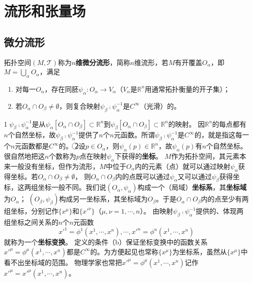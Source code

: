 \chapter{流形和张量场}

\section{微分流形}

\begin{definition}
拓扑空间$(M, \mathscr{T})$称为\textbf{$n$维微分流形}，简称$n$维流形，若$M$有开覆盖${O_\alpha}$，即$M = \bigcup\limits_\alpha O_\alpha$，满足
\begin{enumerate}[（a）]
\item 对每一$O_\alpha$，存在同胚$\psi_\alpha \colon O_\alpha \to V_\alpha$（$V_\alpha$是$\mathbb{R}^n$用通常拓扑衡量的开子集）；
\item 若$O_\alpha \cap O_\beta \neq \emptyset$，则复合映射$\psi_\beta \comp \psi_\alpha^{-1}$是$C^\infty$（光滑）的。
\end{enumerate}
\end{definition}

\begin{note}
\textcircled{1}$\psi_\beta \comp \psi_\alpha^{-1}$是从$\psi_\alpha[O_\alpha \cap O_\beta] \subset \mathbb{R}^n$到$\psi_\beta[O_\alpha \cap O_\beta] \subset \mathbb{R}^n$的映射。
因$\mathbb{R}^n$的每点都有$n$个自然坐标，故$\psi_\beta \comp \psi_\alpha^{-1}$提供了$n$个$n$元函数。所谓$\psi_\beta \comp \psi_\alpha^{-1}$是$C^\infty$的，就是指这每一个$n$元函数都是$C^\infty$的。
\textcircled{2}设$p \in O_\alpha$，则$\psi_\alpha(p) \in \mathbb{R}^n$，故$\psi_\alpha(p)$有$n$个自然坐标。很自然地把这$n$个数称为$p$点在映射$\psi_\alpha$下获得的\textbf{坐标}。
$M$作为拓扑空间，其元素本来一般没有坐标，但作为流形，$M$中位于$O_\alpha$内的元素（点）就可以通过映射$\psi_\alpha$获得坐标。若$O_\alpha \cap O_\beta \neq \emptyset$，
则$O_\alpha \cap O_\beta$内的点既可以通过$\psi_\alpha$又可以通过$\psi_\beta$获得坐标，这两组坐标一般不同。我们说$(O_\alpha, \psi_\alpha)$构成一个（局域）\textbf{坐标系}，其\textbf{坐标域}为$O_\alpha$；
$(O_\beta, \psi_\beta)$构成另一坐标系，其坐标域为$O_\beta$。于是$O_\alpha \cap O_\beta$内的点至少有两组坐标，分别记作$\{x^\mu\}$和$\{x'^\nu\}$（$\mu, \nu = 1, \cdots, n$）。
由映射$\psi_\beta \comp \psi_\alpha^{-1}$提供的、体现两组坐标之间关系的$n$个$n$元函数$$x'^1 = \phi^1(x^1, \cdots, x^n), \cdots, x'^n = \phi^n(x^1, \cdots, x^n)$$就称为一个\textbf{坐标变换}。
定义的条件（b）保证坐标变换中的函数关系$x'^\mu = \phi^\mu(x^1, \cdots, x^n)$都是$C^\infty$的。为方便起见也常称$\{x^\mu\}$为坐标系，虽然从$\{x^\mu\}$中看不出坐标域的范围。
物理学家也常把$x'^\mu = \phi^\mu(x^1, \cdots, x^n)$记作$x'^\mu = x'^\mu(x^1, \cdots, x^n)$。
\end{note}

